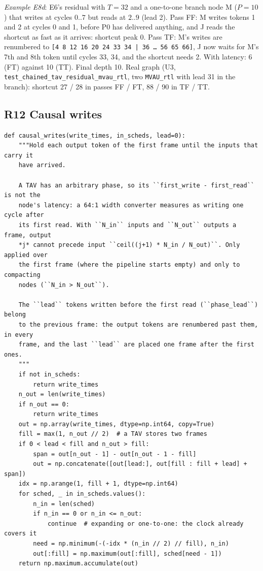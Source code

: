 \documentclass[10pt,a4paper]{article}
\newcommand{\code}[1]{\texttt{#1}}
\newcommand{\Tg}{T}           %
\begin{document}
\emph{Example E8d}: E6's residual with $\Tg=32$ and a one-to-one branch node M
($P=10$) that writes at cycles $0..7$ but reads at $2..9$ (lead 2). Pass FF:
M writes tokens 1 and 2 at cycles 0 and 1, before P0 has delivered anything, and J
reads the shortcut as fast as it arrives: shortcut peak 0. Pass TF: M's writes are
renumbered to \code{[4 8 12 16 20 24 33 34 | 36 \dots\ 56 65 66]}, J now waits for M's
7th and 8th token until cycles 33, 34, and the shortcut needs 2. With latency:
6 (FT) against 10 (TT). Final depth 10. Real graph (U3,
\code{test\_chained\_tav\_residual\_mvau\_rtl}, two \code{MVAU\_rtl} with lead 31 in
the branch): shortcut 27 / 28 in passes FF / FT, 88 / 90 in TF / TT.

\subsection{R12 Causal writes}\label{sec:causal}

\begin{lstlisting}[firstnumber=370,title={\texttt{src/finn/transformation/fpgadataflow/derive\_characteristic.py}, lines 370--402}]
def causal_writes(write_times, in_scheds, lead=0):
    """Hold each output token of the first frame until the inputs that carry it
    have arrived.

    A TAV has an arbitrary phase, so its ``first_write - first_read`` is not the
    node's latency: a 64:1 width converter measures as writing one cycle after
    its first read. With ``N_in`` inputs and ``N_out`` outputs a frame, output
    *j* cannot precede input ``ceil((j+1) * N_in / N_out)``. Only applied over
    the first frame (where the pipeline starts empty) and only to compacting
    nodes (``N_in > N_out``).

    The ``lead`` tokens written before the first read (``phase_lead``) belong
    to the previous frame: the output tokens are renumbered past them, in every
    frame, and the last ``lead`` are placed one frame after the first ones.
    """
    if not in_scheds:
        return write_times
    n_out = len(write_times)
    if n_out == 0:
        return write_times
    out = np.array(write_times, dtype=np.int64, copy=True)
    fill = max(1, n_out // 2)  # a TAV stores two frames
    if 0 < lead < fill and n_out > fill:
        span = out[n_out - 1] - out[n_out - 1 - fill]
        out = np.concatenate([out[lead:], out[fill : fill + lead] + span])
    idx = np.arange(1, fill + 1, dtype=np.int64)
    for sched, _ in in_scheds.values():
        n_in = len(sched)
        if n_in == 0 or n_in <= n_out:
            continue  # expanding or one-to-one: the clock already covers it
        need = np.minimum(-(-idx * (n_in // 2) // fill), n_in)
        out[:fill] = np.maximum(out[:fill], sched[need - 1])
    return np.maximum.accumulate(out)
\end{lstlisting}
\end{document}
